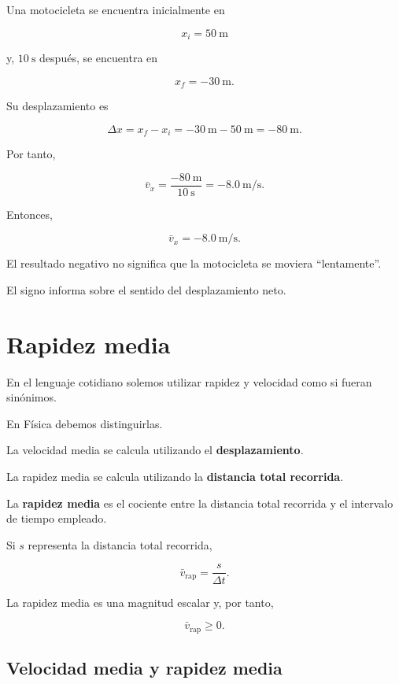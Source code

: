 \begin{ejemplo}

Una motocicleta se encuentra inicialmente en

\[ x_i=\SI{50}{\meter} \]

y, \(\SI{10}{\second}\) después, se encuentra en

\[ x_f=-\SI{30}{\meter}. \]

Su desplazamiento es

\[
\Delta x
=x_f-x_i
=-\SI{30}{\meter}-\SI{50}{\meter}
=-\SI{80}{\meter}.
\]

Por tanto,

\[
\bar{v}_x
=\frac{-\SI{80}{\meter}}{\SI{10}{\second}}
=-\SI{8.0}{\meter\per\second}.
\]

Entonces,

\[ \boxed{\bar{v}_x=-\SI{8.0}{\meter\per\second}}. \]

El resultado negativo no significa que la motocicleta se moviera
``lentamente''.

El signo informa sobre el sentido del desplazamiento neto.
\end{ejemplo}


\section{Rapidez media}

En el lenguaje cotidiano solemos utilizar rapidez y velocidad como si fueran
sinónimos.

En Física debemos distinguirlas.

La velocidad media se calcula utilizando el \textbf{desplazamiento}.

La rapidez media se calcula utilizando la \textbf{distancia total recorrida}.

\begin{definicion}
La \textbf{rapidez media} es el cociente entre la distancia total recorrida
y el intervalo de tiempo empleado.
\end{definicion}

Si \(s\) representa la distancia total recorrida,

\[ \boxed{\bar{v}_{\text{rap}}=\frac{s}{\Delta t}}. \]

La rapidez media es una magnitud escalar y, por tanto,

\[ \bar{v}_{\text{rap}}\geq 0. \]


\subsection{Velocidad media y rapidez media}

